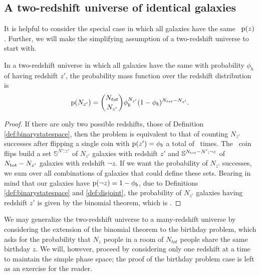 
\subsection{A two-redshift universe of identical galaxies}

It is helpful to consider the special case in which all galaxies have the same \pzpdf\ $\mathrm{p}(z)$.
Further, we will make the simplifying assumption of a two-redshift universe to start with.

\begin{theorem}
	In a two-redshift universe in which all galaxies have the same \pzpdf with probability $\phi_{b}$ of having redshift $z'$, the probability mass function over the redshift distribution is
	\begin{equation}
	\eqlabel{eqn:binomial}
	\pr{N_{z'}} = \binom{N_{tot}}{N_{z'}} \phi_{b}^{N_{z'}} (1 - \phi_{b})^{N_{tot} - N_{z'}} .
	\end{equation}
\end{theorem}

\begin{proof}
If there are only two possible redshifts, those of Definition \ref{def:binarystatespace}, then the problem is equivalent to that of counting $N_{z'}$ successes after flipping a single coin with $\mathrm{p}(z') = \phi_{b}$ a total of \ntot\ times.
The \ntot\ coin flips build a set $\mathbb{S}^{N'; z'}$ of $N_{z'}$ galaxies with redshift $z'$ and $\mathbb{S}^{N_{\mathrm{tot}} - N'; \lnot z}$ of $N_{\mathrm{tot}} - N_{z'}$ galaxies with redshift $\lnot z$.
If we want the probability of $N_{z'}$ successes, we sum over all combinations of galaxies that could define these sets.
Bearing in mind that our galaxies have $\mathrm{p}(\lnot z) = 1 - \phi_{b}$, due to Definitions \ref{def:binarystatespace} and \ref{def:disjoint}, the probability of $N_{z'}$ galaxies having redshift $z'$ is given by the binomial theorem, which is .
\end{proof}

We may generalize the two-redshift universe to a many-redshift universe by considering the extension of the binomial theorem to the birthday problem, which asks for the probability that $N_{z}$ people in a room of $N_{tot}$ people share the same birthday $z$.
We will, however, proceed by considering only one redshift at a time to maintain the simple phase space; the proof of the birthday problem case is left as an exercise for the reader.


